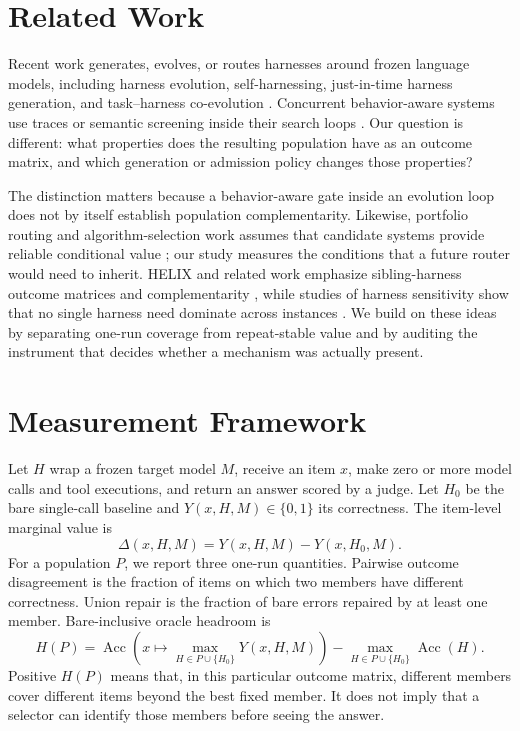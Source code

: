 \documentclass{article}
\begin{document}
\section{Related Work}

Recent work generates, evolves, or routes harnesses around frozen language
models, including harness evolution, self-harnessing, just-in-time harness
generation, and task--harness co-evolution \citep{tthe2026,selfharness2026,
jitagent2026,coevolve2026}. Concurrent behavior-aware systems use traces or
semantic screening inside their search loops \citep{harnesslens2026,
harnessfix2026,ahe2026,gatedqd2026,handbook2026}. Our question is different:
what properties does the resulting population have as an outcome matrix, and
which generation or admission policy changes those properties?

The distinction matters because a behavior-aware gate inside an evolution loop
does not by itself establish population complementarity. Likewise, portfolio
routing and algorithm-selection work assumes that candidate systems provide
reliable conditional value \citep{rice1976,xu2008satzilla,kotthoff2016}; our
study measures the conditions that a future router would need to inherit.
HELIX and related work emphasize sibling-harness outcome matrices and
complementarity \citep{helix2026}, while studies of harness sensitivity show
that no single harness need dominate across instances
\citep{nouniversal2026,nonmonotone2026}. We build on these ideas by separating
one-run coverage from repeat-stable value and by auditing the instrument that
decides whether a mechanism was actually present.

\section{Measurement Framework}

Let $H$ wrap a frozen target model $M$, receive an item $x$, make zero or more
model calls and tool executions, and return an answer scored by a judge. Let
$H_0$ be the bare single-call baseline and $Y(x,H,M)\in\{0,1\}$ its correctness.
The item-level marginal value is
\[
\Delta(x,H,M)=Y(x,H,M)-Y(x,H_0,M).
\]
For a population $P$, we report three one-run quantities. Pairwise outcome
disagreement is the fraction of items on which two members have different
correctness. Union repair is the fraction of bare errors repaired by at least
one member. Bare-inclusive oracle headroom is
\[
H(P)=\operatorname{Acc}\left(x\mapsto\max_{H\in P\cup\{H_0\}}Y(x,H,M)\right)
-\max_{H\in P\cup\{H_0\}}\operatorname{Acc}(H).
\]
Positive $H(P)$ means that, in this particular outcome matrix, different
members cover different items beyond the best fixed member. It does not imply
that a selector can identify those members before seeing the answer.
\end{document}
